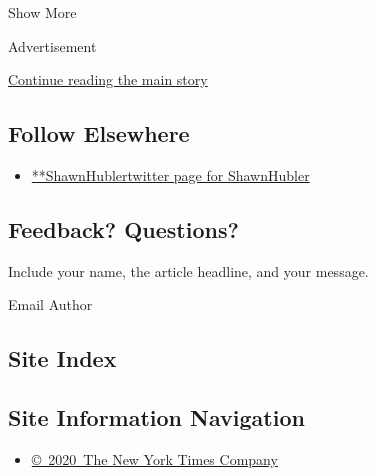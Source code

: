 Show More

Advertisement

\protect\hyperlink{after-mid2}{Continue reading the main story}

\hypertarget{follow-elsewhere}{%
\subsection{Follow Elsewhere}\label{follow-elsewhere}}

\begin{itemize}
\tightlist
\item
  \href{https://twitter.com/ShawnHubler}{**ShawnHublertwitter page for
  ShawnHubler}
\end{itemize}

\hypertarget{feedback-questions}{%
\subsection{Feedback? Questions?}\label{feedback-questions}}

Include your name, the article headline, and your message.

Email Author

\hypertarget{site-index}{%
\subsection{Site Index}\label{site-index}}

\hypertarget{site-information-navigation}{%
\subsection{Site Information
Navigation}\label{site-information-navigation}}

\begin{itemize}
\tightlist
\item
  \href{https://help.nytimes.com/hc/en-us/articles/115014792127-Copyright-notice}{©~2020~The
  New York Times Company}
\end{itemize}

